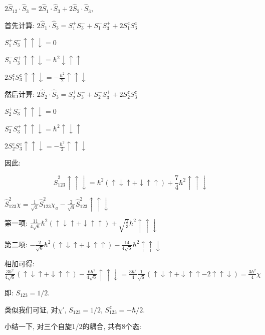 $2 \hat S_{12} \cdot \hat S_3 = 2\hat S_1 \cdot \hat S_3 + 2\hat S_2
\cdot \hat S_3$,

首先计算: $2\hat S_1 \cdot \hat S_3  = S_1^+ S_3^- + S_1^- S_3^+ + 2
S_1^z S_3^z$

$S_1^+ S_3^- \uparrow \uparrow \downarrow = 0$

$S_1^- S_3^+ \uparrow \uparrow \downarrow = \hbar^2 \downarrow
\uparrow \uparrow$

$2S_1^z S_3^z \uparrow \uparrow \downarrow =-\frac{\hbar^2}{2}
\uparrow \uparrow \downarrow$

然后计算: $2\hat S_2 \cdot \hat S_3  = S_2^+ S_3^- + S_2^- S_3^+ + 2
S_2^z S_3^z$

$S_2^+ S_3^- \uparrow \uparrow \downarrow = 0$

$S_2^- S_3^+ \uparrow \uparrow \downarrow = \hbar^2 \uparrow
\downarrow \uparrow$

$2S_2^z S_3^z \uparrow \uparrow \downarrow =- \frac{\hbar^2}{2}
\uparrow \uparrow \downarrow$

因此:

\begin{equation*}
\hat S_{123}^2 \uparrow \uparrow \downarrow = \hbar^2 (\uparrow
\downarrow \uparrow + \downarrow \uparrow \uparrow) + \frac{7}{4}
\hbar^2 \uparrow \uparrow \downarrow
\end{equation*}


$\hat S_{123}^2 \chi = \frac{1}{\sqrt 3} \hat S_{123}^2 \chi_a -
\frac{2}{\sqrt 6} \hat S_{123}^2 \uparrow \uparrow \downarrow$

第一项: $\frac{11}{4 \sqrt 6}\hbar^2 \left( \uparrow\downarrow
\uparrow + \downarrow\uparrow \uparrow \right)  + \sqrt{\frac{2}{3}}
\hbar^2 \uparrow \uparrow \downarrow$

第二项: $-\frac{2}{\sqrt 6}\hbar^2 (\uparrow \downarrow \uparrow +
\downarrow \uparrow \uparrow) -\frac{14}{4 \sqrt 6}\hbar^2 \uparrow
\uparrow \downarrow$

相加可得: $\frac{3\hbar^2}{4\sqrt 6} (\uparrow \downarrow \uparrow +
\downarrow \uparrow \uparrow)- \frac{6 \hbar^2}{4\sqrt 6} \uparrow
\uparrow \downarrow = \frac{3\hbar^2}{4}\frac{1}{\sqrt 6}(\uparrow
\downarrow \uparrow + \downarrow \uparrow \uparrow -2\uparrow
\uparrow \downarrow) = \frac{3\hbar^2}{4} \chi$

即: $S_{123}=1/2$.

类似我们可证, 对$\chi'$, $S_{123}=1/2$, $S_{123}^z =- \hbar/2$.

小结一下, 对三个自旋1/2的耦合, 共有8个态:

